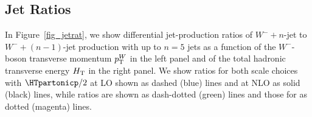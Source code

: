 
\subsection{Jet Ratios}
\label{sec_jetratio}

In Figure~\ref{fig_jetrat}, we show differential jet-production ratios of $W^-+n$-jet to $W^-+(n-1)$-jet production with up to $n=5$ jets as a function of the $W^-$-boson
transverse momentum $p_{\textrm T}^W$ in the left panel and of the total hadronic transverse energy $H_{\textrm
T}$ in the right panel. We show ratios for both scale choices with
$\HTpartonicp/2$ at LO shown as dashed (blue)
lines and at NLO as solid (black) lines, while \MILOp{} ratios are
shown as dash-dotted (green) lines and those for \MINLOp{} as
dotted (magenta) lines.



